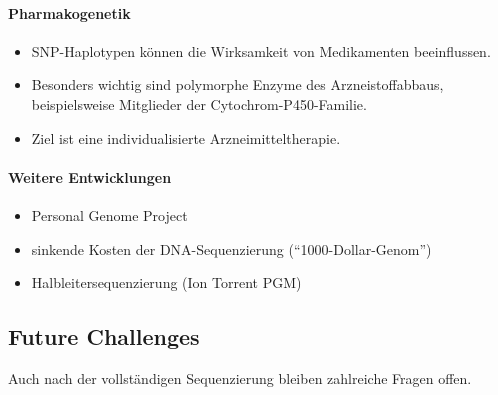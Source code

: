 \paragraph{Pharmakogenetik}

\begin{itemize}

    \item SNP-Haplotypen können die
    Wirksamkeit von Medikamenten beeinflussen.

    \item Besonders wichtig sind polymorphe
    Enzyme des Arzneistoffabbaus,
    beispielsweise Mitglieder der
    Cytochrom-P450-Familie.

    \item Ziel ist eine
    individualisierte Arzneimitteltherapie.
\end{itemize}

\paragraph{Weitere Entwicklungen}

\begin{itemize}

    \item Personal Genome Project

    \item sinkende Kosten der DNA-Sequenzierung
    (``1000-Dollar-Genom'')

    \item Halbleitersequenzierung
    (Ion Torrent PGM)

\end{itemize}



\subsection*{Future Challenges}\label{subsec:future-challenges}

Auch nach der vollständigen Sequenzierung
bleiben zahlreiche Fragen offen.

